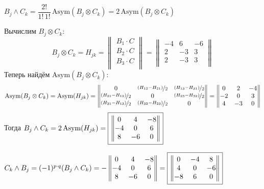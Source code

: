 \documentclass{article}
\newcommand*\squared[1]{\tikz[baseline=(char.base)]{
            \node[shape=rectangle,draw,inner sep=4pt] (char) {#1};}}
\begin{document}
\begin{center}
$B_j \wedge C_k = \dfrac{2!}{1!\,1!}\,\text{Asym}(B_j\otimes C_k) = 2\,\text{Asym}(B_j\otimes C_k)$
\end{center}
Вычислим $B_j\otimes C_k$:
$$B_j\otimes C_k = H_{jk} = \begin{Vmatrix}
B_1 \cdot C \\
B_2 \cdot C \\
B_3 \cdot C \\
\end{Vmatrix} = \begin{Vmatrix}
-4 & 6 & -6 \\
2 & -3 & 3 \\
2 & -3 & 3 \\
\end{Vmatrix}$$
Теперь найдём $\text{Asym}(B_j\otimes C_k)$:
$$\text{Asym}(B_j\otimes C_k) = \text{Asym}(H_{jk}) = \begin{Vmatrix}
0 & \nicefrac{(H_{12} - H_{21})}{2} & \nicefrac{(H_{13} - H_{31})}{2} \\
\nicefrac{(H_{21} - H_{12})}{2} & 0 & \nicefrac{(H_{23} - H_{32})}{2} \\
\nicefrac{(H_{31} - H_{13})}{2} & \nicefrac{(H_{32} - H_{23})}{2} & 0
\end{Vmatrix} = \begin{Vmatrix}
0 & 2 & -4 \\
-2 & 0 & 3 \\
4 & -3 & 0
\end{Vmatrix}$$
Тогда $B_j\wedge C_k = 2\,\text{Asym}(H_{jk}) = \squared{$\begin{Vmatrix}
0 & 4 & -8 \\
-4 & 0 & 6 \\
8 & -6 & 0
\end{Vmatrix}$}$
\, \\
\begin{center}
$C_k \wedge B_j = (-1)^{p\cdot q}(B_j\wedge C_k) = - \begin{Vmatrix}
0 & 4 & -8 \\
-4 & 0 & 6 \\
8 & -6 & 0
\end{Vmatrix} = \squared{$\begin{Vmatrix}
0 & -4 & 8 \\
4 & 0 & -6 \\
-8 & 6 & 0
\end{Vmatrix}$}$
\end{center}
\, \\ \, \\
\end{document}
